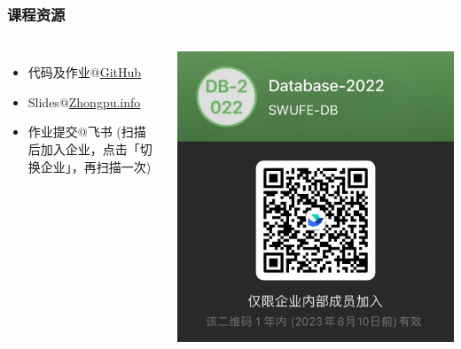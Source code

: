 \documentclass[aspectratio=169, 14pt]{beamer}
\begin{document}
\begin{frame}
    \frametitle{课程资源}
    \begin{columns}
        \begin{itemize}
            \item 代码及作业@\href{https://github.com/ChenZhongPu/db-swufe}{GitHub}
            \item Slides@\href{https://zhongpu.info/teaching/cs205-2022-fall/}{Zhongpu.info}
            \item 作业提交@飞书 (\small 扫描后加入企业，点击\alert{「切换企业」}，再扫描一次)
        \end{itemize}
        \includegraphics[height=0.85\paperheight]{image/feishu}
    \end{columns}
\end{frame}
\end{document}
